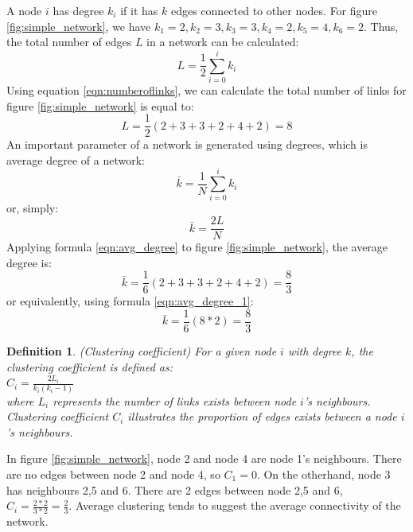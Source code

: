 \documentclass[12pt]{article}
\newtheorem{definition}{Definition}[section]
\begin{document}
\par
A node $i$ has degree $k_i$ if it has $k$ edges connected to other nodes. For figure \ref{fig:simple_network}, we have $k_1=2,k_2=3,k_3=3,k_4=2,k_5=4,k_6=2$. Thus, the total number of edges $L$ in a network can be calculated:
\begin{equation}
    L = \frac{1}{2}\sum^{i}_{i=0}{k_i}
    \label{eqn:numberoflinks}
\end{equation}
Using equation \ref{eqn:numberoflinks}, we can calculate the total number of links for figure \ref{fig:simple_network} is equal to:\\
\begin{equation}
    L =\frac{1}{2}(2+3+3+2+4+2)=8
\end{equation}
An important parameter of a network is generated using degrees, which is average degree of a network:
\begin{equation}
    \bar{k}=\frac{1}{N} \sum^{i}_{i=0}{k_i}
    \label{eqn:avg_degree}
\end{equation}
or, simply:
\begin{equation}
    \bar{k}=\frac{2L}{N}
    \label{eqn:avg_degree_1}
\end{equation}
Applying formula \ref{eqn:avg_degree} to figure \ref{fig:simple_network}, the average degree is:
\begin{equation}
    \bar{k} = \frac{1}{6}(2+3+3+2+4+2)=\frac{8}{3}
\end{equation}
or equivalently, using formula \ref{eqn:avg_degree_1}:
\begin{equation}
    \bar{k} = \frac{1}{6}(8*2)=\frac{8}{3}
\end{equation}
\begin{definition}{(Clustering coefficient)}
For a given node $i$ with degree $k$, the clustering coefficient is defined as:\\
    $C_i=\frac{2L_i}{k_i(k_i-1)}$\\
    where $L_i$ represents the number of links exists between node $i$'s neighbours.\\
    Clustering coefficient $C_i$ illustrates the proportion of edges exists between a node $i$'s neighbours. 
\end{definition}
\par 
In figure \ref{fig:simple_network}, node 2 and node 4 are node 1's neighbours. There are no edges between node 2 and node 4, so $C_1 = 0$. On the otherhand, node 3 has neighbours 2,5 and 6. There are 2 edges between node 2,5 and 6, $C_i=\frac{2*2}{3*2}=\frac{2}{3}$. Average clustering tends to suggest the average connectivity of the network.
\end{document}

